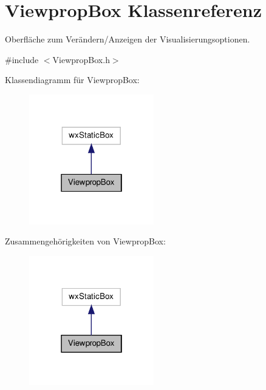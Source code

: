 \hypertarget{classViewpropBox}{\section{Viewprop\-Box Klassenreferenz}
\label{classViewpropBox}
}


Oberfläche zum Verändern/\-Anzeigen der Visualisierungsoptionen.  




{\ttfamily \#include $<$Viewprop\-Box.\-h$>$}



Klassendiagramm für Viewprop\-Box\-:\nopagebreak
\begin{figure}[H]
\begin{center}
\leavevmode
\includegraphics[width=154pt]{classViewpropBox__inherit__graph}
\end{center}
\end{figure}


Zusammengehörigkeiten von Viewprop\-Box\-:\nopagebreak
\begin{figure}[H]
\begin{center}
\leavevmode
\includegraphics[width=154pt]{classViewpropBox__coll__graph}
\end{center}
\end{figure}
